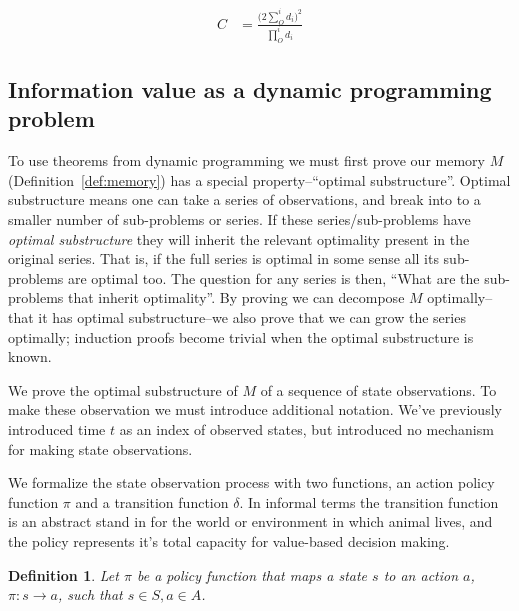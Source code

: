 \documentclass[9pt,twocolumn,twoside]{pnas-new}
\newtheorem{definition}{Definition}
\begin{document}
\begin{equation} \label{eq:compactcude}
\begin{split}
    C & = \frac{\Big ( 2 \sum_{O}^{i} d_i \Big )^2}{\prod_{O}^{i} d_i}
\end{split}
\end{equation}



\subsection*{Information value as a dynamic programming problem}
To use theorems from dynamic programming we must first prove our memory $M$ (Definition~\ref{def:memory}) has a special property--``optimal substructure''. Optimal substructure means one can take a series of observations, and break into to a smaller number of sub-problems or series. If these series/sub-problems have \textit{optimal substructure} they will inherit the relevant optimality present in the original series. That is, if the full series is optimal in some sense all its sub-problems are optimal too. The question for any series is then, ``What are the sub-problems that inherit optimality''. By proving we can decompose $M$ optimally--that it has optimal substructure--we also prove that we can grow the series optimally; induction proofs become trivial when the optimal substructure is known. 

We prove the optimal substructure of $M$ of a sequence of state observations. To make these observation we must introduce additional notation. We've previously introduced time $t$ as an index of observed states, but introduced no mechanism for making state observations. 

We formalize the state observation process with two functions, an action policy function $\pi$ and a transition function $\delta$. In informal terms the transition function is an abstract stand in for the world or environment in which animal lives, and the policy represents it's total capacity for value-based decision making.

\begin{definition}
    \label{def:policy}
    Let $\pi$ be a policy function that maps a state $s$ to an action $a$, $\pi : s \rightarrow a$, such that $s \in S, a \in A$.
\end{definition}
\end{document}

